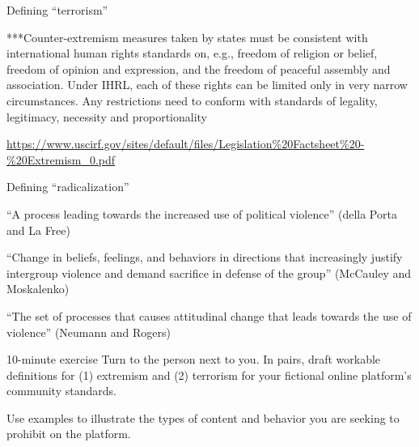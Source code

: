 \documentclass[nobackground,dvipsnames,table]{beamer}
\begin{document}
\begin{frame}{Defining “terrorism”}
{{***Counter-extremism measures taken by states must be consistent with international human rights standards on, e.g., freedom of religion or belief, freedom of opinion and expression, and the freedom of peaceful assembly and association. Under IHRL, each of these rights can be limited only in very narrow circumstances. Any restrictions need to conform with standards of legality, legitimacy, necessity and proportionality

\url{https://www.uscirf.gov/sites/default/files/Legislation\%20Factsheet\%20-\%20Extremism_0.pdf}
}
}
\end{frame}


\begin{frame}{Defining “radicalization”}

\begin{center}
    “A process leading towards the increased use of political violence” (della Porta and La Free) \newline 

    “Change in beliefs, feelings, and behaviors in directions that increasingly justify intergroup violence and demand sacrifice in defense of the group” (McCauley and Moskalenko) \newline 

    “The set of processes that causes attitudinal change that leads towards the use of violence” (Neumann and Rogers)
\end{center}

\end{frame}


\begin{frame}{10-minute exercise}
Turn to the person next to you. In pairs, draft workable definitions for (1) extremism and (2) terrorism for your fictional online platform’s community standards. \newline \newline 

Use examples to illustrate the types of content and behavior you are seeking to prohibit on the platform.

\end{frame}
\end{document}
